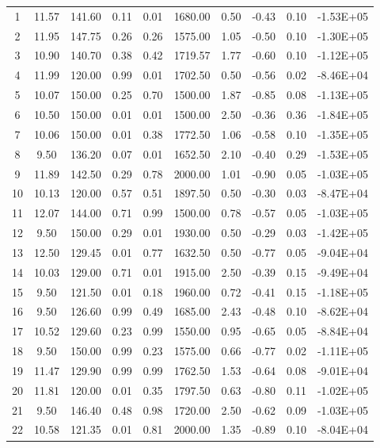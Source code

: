 \begin{landscape}
\begin{center}
\begin{longtable}{|c|c|c|c|c|c|c|c|c|c|}
1  & 11.57 & 141.60 & 0.11 & 0.01 & 1680.00 & 0.50 & -0.43 & 0.10 & -1.53E+05 \\
2  & 11.95 & 147.75 & 0.26 & 0.26 & 1575.00 & 1.05 & -0.50 & 0.10 & -1.30E+05 \\
3  & 10.90 & 140.70 & 0.38 & 0.42 & 1719.57 & 1.77 & -0.60 & 0.10 & -1.12E+05 \\
4  & 11.99 & 120.00 & 0.99 & 0.01 & 1702.50 & 0.50 & -0.56 & 0.02 & -8.46E+04 \\
5  & 10.07 & 150.00 & 0.25 & 0.70 & 1500.00 & 1.87 & -0.85 & 0.08 & -1.13E+05 \\
6  & 10.50 & 150.00 & 0.01 & 0.01 & 1500.00 & 2.50 & -0.36 & 0.36 & -1.84E+05 \\
7  & 10.06 & 150.00 & 0.01 & 0.38 & 1772.50 & 1.06 & -0.58 & 0.10 & -1.35E+05 \\
8  & 9.50  & 136.20 & 0.07 & 0.01 & 1652.50 & 2.10 & -0.40 & 0.29 & -1.53E+05 \\
9  & 11.89 & 142.50 & 0.29 & 0.78 & 2000.00 & 1.01 & -0.90 & 0.05 & -1.03E+05 \\
10 & 10.13 & 120.00 & 0.57 & 0.51 & 1897.50 & 0.50 & -0.30 & 0.03 & -8.47E+04 \\
11 & 12.07 & 144.00 & 0.71 & 0.99 & 1500.00 & 0.78 & -0.57 & 0.05 & -1.03E+05 \\
12 & 9.50  & 150.00 & 0.29 & 0.01 & 1930.00 & 0.50 & -0.29 & 0.03 & -1.42E+05 \\
13 & 12.50 & 129.45 & 0.01 & 0.77 & 1632.50 & 0.50 & -0.77 & 0.05 & -9.04E+04 \\
14 & 10.03 & 129.00 & 0.71 & 0.01 & 1915.00 & 2.50 & -0.39 & 0.15 & -9.49E+04 \\
15 & 9.50  & 121.50 & 0.01 & 0.18 & 1960.00 & 0.72 & -0.41 & 0.15 & -1.18E+05 \\
16 & 9.50  & 126.60 & 0.99 & 0.49 & 1685.00 & 2.43 & -0.48 & 0.10 & -8.62E+04 \\
17 & 10.52 & 129.60 & 0.23 & 0.99 & 1550.00 & 0.95 & -0.65 & 0.05 & -8.84E+04 \\
18 & 9.50  & 150.00 & 0.99 & 0.23 & 1575.00 & 0.66 & -0.77 & 0.02 & -1.11E+05 \\
19 & 11.47 & 129.90 & 0.99 & 0.99 & 1762.50 & 1.53 & -0.64 & 0.08 & -9.01E+04 \\
20 & 11.81 & 120.00 & 0.01 & 0.35 & 1797.50 & 0.63 & -0.80 & 0.11 & -1.02E+05 \\
21 & 9.50  & 146.40 & 0.48 & 0.98 & 1720.00 & 2.50 & -0.62 & 0.09 & -1.03E+05 \\
22 & 10.58 & 121.35 & 0.01 & 0.81 & 2000.00 & 1.35 & -0.89 & 0.10 & -8.04E+04 \\

\end{longtable}
\end{center}
\end{landscape}
